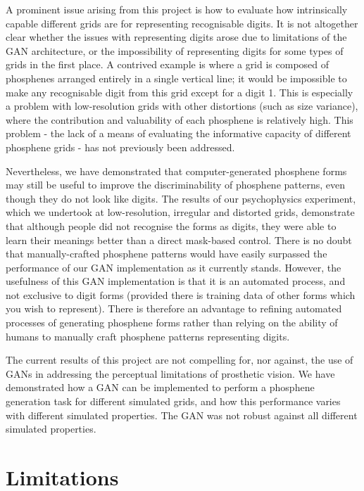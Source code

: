\documentclass[a4paper,11pt,openany]{book}
\begin{document}
A prominent issue arising from this project is how to evaluate how intrinsically capable different grids are for representing recognisable digits.
It is not altogether clear whether the issues with representing digits arose due to limitations of the GAN architecture, or the impossibility of representing digits for some types of grids in the first place.
A contrived example is where a grid is composed of phosphenes arranged entirely in a single vertical line; it would be impossible to make any recognisable digit from this grid except for a digit 1.
This is especially a problem with low-resolution grids with other distortions (such as size variance), where the contribution and valuability of each phosphene is relatively high.
This problem - the lack of a means of evaluating the informative capacity of different phosphene grids - has not previously been addressed.

Nevertheless, we have demonstrated that computer-generated phosphene forms may still be useful to improve the discriminability of phosphene patterns, even though they do not look like digits.
The results of our psychophysics experiment, which we undertook at low-resolution, irregular and distorted grids, demonstrate that although people did not recognise the forms as digits, they were able to learn their meanings better than a direct mask-based control.
There is no doubt that manually-crafted phosphene patterns would have easily surpassed the performance of our GAN implementation as it currently stands.
However, the usefulness of this GAN implementation is that it is an automated process, and not exclusive to digit forms (provided there is training data of other forms which you wish to represent).
There is therefore an advantage to refining automated processes of generating phosphene forms rather than relying on the ability of humans to manually craft phosphene patterns representing digits.

The current results of this project are not compelling for, nor against, the use of GANs in addressing the perceptual limitations of prosthetic vision.
We have demonstrated how a GAN can be implemented to perform a phosphene generation task for different simulated grids, and how this performance varies with different simulated properties.
The GAN was not robust against all different simulated properties.

\chapter{Limitations}
\label{sec:orge40dad7}
\end{document}

